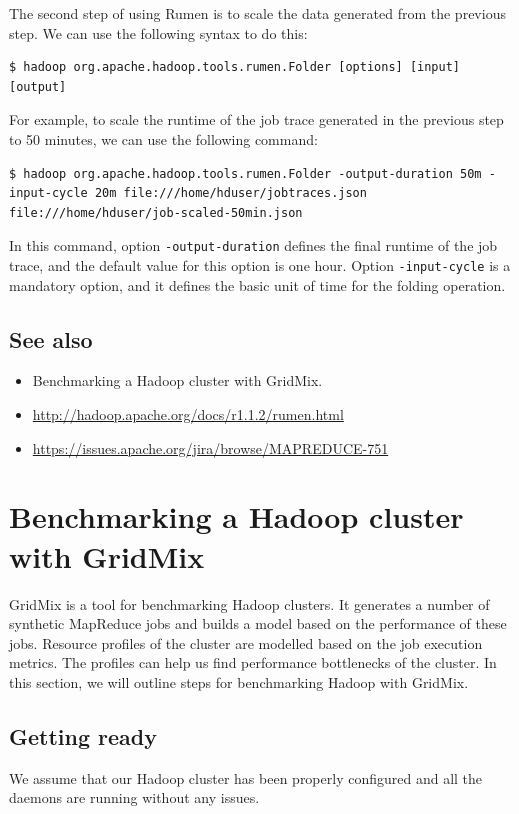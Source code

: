 The second step of using Rumen is to scale the data generated from the previous step. We can use the following syntax to do this:
\lstset{style=bashstyle}
\begin{lstlisting}
$ hadoop org.apache.hadoop.tools.rumen.Folder [options] [input] [output]
\end{lstlisting}

For example, to scale the runtime of the job trace generated in the previous step to 50 minutes, we can use the following command:
\lstset{style=bashstyle}
\begin{lstlisting}
$ hadoop org.apache.hadoop.tools.rumen.Folder -output-duration 50m -input-cycle 20m file:///home/hduser/jobtraces.json file:///home/hduser/job-scaled-50min.json
\end{lstlisting}

In this command, option \verb|-output-duration| defines the final runtime of the job trace, and the default value for this option is one hour. Option \verb|-input-cycle| is a mandatory option, and it defines the basic unit of time for the folding operation.
\subsection*{See also}
\begin{itemize}
  \item Benchmarking a Hadoop cluster with GridMix.
  \item \url{http://hadoop.apache.org/docs/r1.1.2/rumen.html}
  \item \url{https://issues.apache.org/jira/browse/MAPREDUCE-751}
\end{itemize}
\section{Benchmarking a Hadoop cluster with GridMix}
GridMix is a tool for benchmarking Hadoop clusters. It generates a number of synthetic MapReduce jobs and builds a model based on the performance of these jobs. Resource profiles of the cluster are modelled based on the job execution metrics. The profiles can help us find performance bottlenecks of the cluster. In this section, we will outline steps for benchmarking Hadoop with GridMix.
\subsection*{Getting ready}
We assume that our Hadoop cluster has been properly configured and all the daemons are running without any issues.

